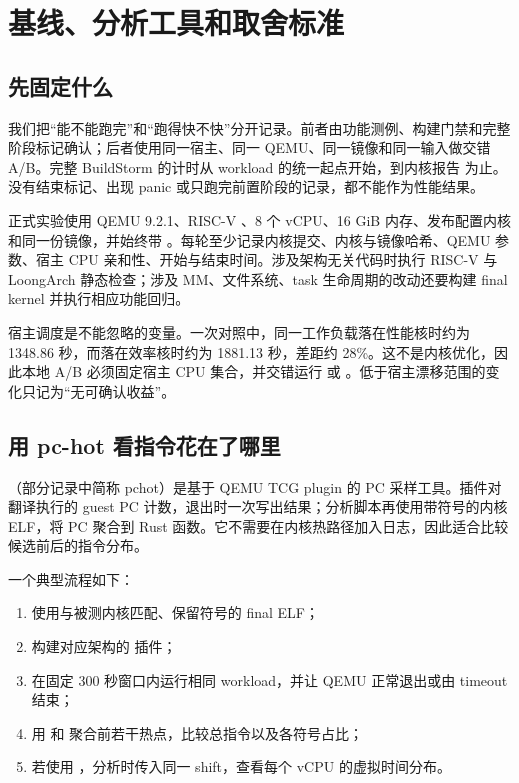 \chapter{基线、分析工具和取舍标准}

\section{先固定什么}

我们把“能不能跑完”和“跑得快不快”分开记录。前者由功能测例、构建门禁和完整阶段标记确认；后者使用同一宿主、同一 QEMU、同一镜像和同一输入做交错 A/B。完整 BuildStorm 的计时从 workload 的统一起点开始，到内核报告  为止。没有结束标记、出现 panic 或只跑完前置阶段的记录，都不能作为性能结果。

正式实验使用 QEMU 9.2.1、RISC-V 、8 个 vCPU、16 GiB 内存、发布配置内核和同一份镜像，并始终带 。每轮至少记录内核提交、内核与镜像哈希、QEMU 参数、宿主 CPU 亲和性、开始与结束时间。涉及架构无关代码时执行 RISC-V 与 LoongArch 静态检查；涉及 MM、文件系统、task 生命周期的改动还要构建 final kernel 并执行相应功能回归。

宿主调度是不能忽略的变量。一次对照中，同一工作负载落在性能核时约为 1348.86 秒，而落在效率核时约为 1881.13 秒，差距约 28\%。这不是内核优化，因此本地 A/B 必须固定宿主 CPU 集合，并交错运行  或 。低于宿主漂移范围的变化只记为“无可确认收益”。

\section{用 pc-hot 看指令花在了哪里}

（部分记录中简称 pchot）是基于 QEMU TCG plugin 的 PC 采样工具。插件对翻译执行的 guest PC 计数，退出时一次写出结果；分析脚本再使用带符号的内核 ELF，将 PC 聚合到 Rust 函数。它不需要在内核热路径加入日志，因此适合比较候选前后的指令分布。

一个典型流程如下：

\begin{enumerate}
  \item 使用与被测内核匹配、保留符号的 final ELF；
  \item 构建对应架构的  插件；
  \item 在固定 300 秒窗口内运行相同 workload，并让 QEMU 正常退出或由 timeout 结束；
  \item 用  和  聚合前若干热点，比较总指令以及各符号占比；
  \item 若使用 ，分析时传入同一 shift，查看每个 vCPU 的虚拟时间分布。
\end{enumerate}

